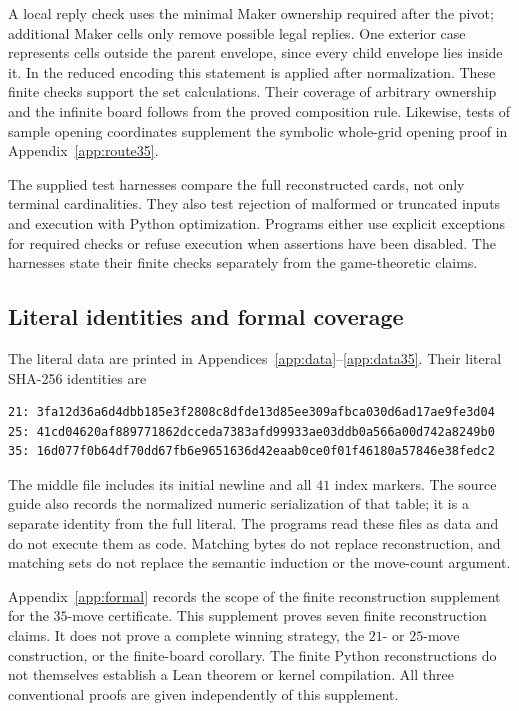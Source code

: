 A local reply check uses the minimal Maker ownership required after
the pivot; additional Maker cells only remove possible legal replies.
One exterior case represents cells outside the parent envelope,
since every child envelope lies inside it. In the reduced encoding
this statement is applied after normalization. These finite checks
support the set calculations. Their coverage of arbitrary ownership
and the infinite board follows from the proved composition rule.
Likewise, tests of sample opening coordinates supplement the
symbolic whole-grid opening proof in Appendix~\ref{app:route35}.

The supplied test harnesses compare the full reconstructed cards,
not only terminal cardinalities. They also test rejection of
malformed or truncated inputs and execution with Python optimization.
Programs either use explicit exceptions for required checks or
refuse execution when assertions have been disabled. The harnesses
state their finite checks separately from the game-theoretic claims.

\subsection{Literal identities and formal coverage}

The literal data are printed in Appendices~\ref{app:data}--\ref{app:data35}.
Their literal SHA-256 identities are
\begin{lstlisting}[basicstyle=\ttfamily\scriptsize]
21: 3fa12d36a6d4dbb185e3f2808c8dfde13d85ee309afbca030d6ad17ae9fe3d04
25: 41cd04620af889771862dcceda7383afd99933ae03ddb0a566a00d742a8249b0
35: 16d077f0b64df70dd67fb6e9651636d42eaab0ce0f01f46180a57846e38fedc2
\end{lstlisting}
The middle file includes its initial newline and all $41$ index markers.
The source guide also records the normalized numeric serialization of
that table; it is a separate identity from the full literal. The
programs read these files as data and do not execute them as code.
Matching bytes do not replace reconstruction, and matching sets do
not replace the semantic induction or the move-count argument.

Appendix~\ref{app:formal} records the scope of the finite reconstruction
supplement for the $35$-move certificate. This supplement proves seven
finite reconstruction claims. It does not prove a complete winning
strategy, the $21$- or $25$-move construction, or the finite-board
corollary. The finite Python reconstructions do not themselves establish
a Lean theorem or kernel compilation. All three conventional proofs
are given independently of this supplement.
